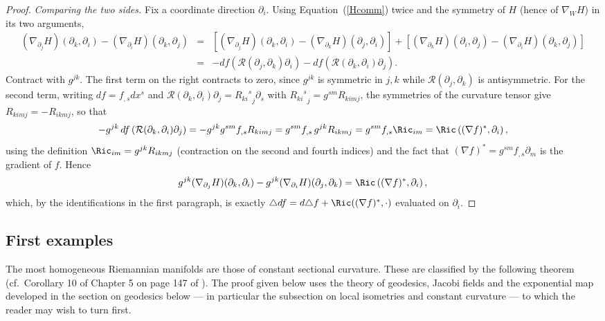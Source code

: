 \begin{proof}
\emph{Comparing the two sides.} Fix a coordinate direction
$\partial_i$. Using Equation~(\ref{Hcomm}) twice and the symmetry
of $H$ (hence of $\nabla_WH$) in its two arguments,
\begin{eqnarray*}
(\nabla_{\partial_j}H)(\partial_k,\partial_i)
-(\nabla_{\partial_i}H)(\partial_k,\partial_j)
& = & \left[(\nabla_{\partial_j}H)(\partial_k,\partial_i)
-(\nabla_{\partial_k}H)(\partial_j,\partial_i)\right]
+\left[(\nabla_{\partial_k}H)(\partial_i,\partial_j)
-(\nabla_{\partial_i}H)(\partial_k,\partial_j)\right]\\
& = & -df\left({\mathcal R}(\partial_j,\partial_k)\partial_i\right)
-df\left({\mathcal R}(\partial_k,\partial_i)\partial_j\right).
\end{eqnarray*}
Contract with $g^{jk}$. The first term on the right contracts to
zero, since $g^{jk}$ is symmetric in $j,k$ while ${\mathcal
R}(\partial_j,\partial_k)$ is antisymmetric. For the second term,
writing $df=f_{,s}dx^s$ and ${\mathcal
R}(\partial_k,\partial_i)\partial_j={{R_{ki}}^s}_j\partial_s$ with
${{R_{ki}}^s}_j=g^{sm}R_{kimj}$, the symmetries of the curvature
tensor give $R_{kimj}=-R_{ikmj}$, so that
$$-g^{jk}\,df\left({\mathcal R}(\partial_k,\partial_i)\partial_j\right)
=-g^{jk}g^{sm}f_{,s}R_{kimj}
=g^{sm}f_{,s}\,g^{jk}R_{ikmj}
=g^{sm}f_{,s}\Ric_{im}
=\Ric\left((\nabla f)^*,\partial_i\right),$$
using the definition $\Ric_{im}=g^{jk}R_{ikmj}$ (contraction on the
second and fourth indices) and the fact that $(\nabla
f)^*=g^{sm}f_{,s}\partial_m$ is the gradient of $f$. Hence
$$g^{jk}(\nabla_{\partial_j}H)(\partial_k,\partial_i)
-g^{jk}(\nabla_{\partial_i}H)(\partial_j,\partial_k)
=\Ric\left((\nabla f)^*,\partial_i\right),$$
which, by the identifications in the first paragraph, is exactly
$\triangle df=d\triangle f+\Ric((\nabla f)^*,\cdot)$ evaluated on
$\partial_i$.
\end{proof}




\subsection{First examples}

The most homogeneous Riemannian manifolds are those of constant
sectional curvature. These are classified by the following theorem
(cf.\ Corollary 10 of Chapter 5 on page 147 of \cite{Petersen}). The
proof given below uses the theory of geodesics, Jacobi fields and
the exponential map developed in the section on geodesics below ---
in particular the subsection on local isometries and constant
curvature --- to which the reader may wish to turn first.

